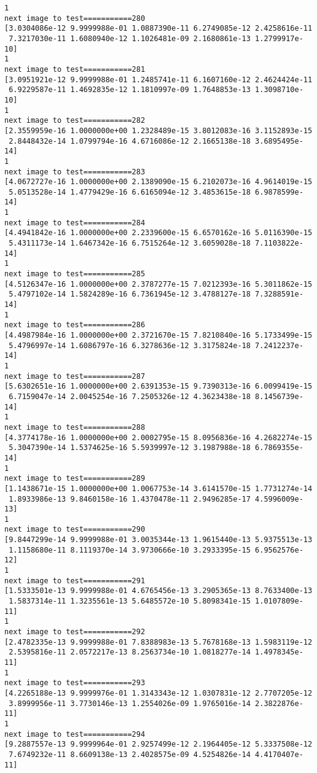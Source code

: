 \documentclass[11pt]{article}
\begin{document}
\begin{Verbatim}[commandchars=\\\{\}]
1
next image to test===========280
[3.0304086e-12 9.9999988e-01 1.0887390e-11 6.2749085e-12 2.4258616e-11
 7.3217030e-11 1.6080940e-12 1.1026481e-09 2.1680861e-13 1.2799917e-10]
1
next image to test===========281
[3.0951921e-12 9.9999988e-01 1.2485741e-11 6.1607160e-12 2.4624424e-11
 6.9229587e-11 1.4692835e-12 1.1810997e-09 1.7648853e-13 1.3098710e-10]
1
next image to test===========282
[2.3559959e-16 1.0000000e+00 1.2328489e-15 3.8012083e-16 3.1152893e-15
 2.8448432e-14 1.0799794e-16 4.6716086e-12 2.1665138e-18 3.6895495e-14]
1
next image to test===========283
[4.0672727e-16 1.0000000e+00 2.1389090e-15 6.2102073e-16 4.9614019e-15
 5.0513528e-14 1.4779429e-16 6.6165094e-12 3.4853615e-18 6.9878599e-14]
1
next image to test===========284
[4.4941842e-16 1.0000000e+00 2.2339600e-15 6.6570162e-16 5.0116390e-15
 5.4311173e-14 1.6467342e-16 6.7515264e-12 3.6059028e-18 7.1103822e-14]
1
next image to test===========285
[4.5126347e-16 1.0000000e+00 2.3787277e-15 7.0212393e-16 5.3011862e-15
 5.4797102e-14 1.5824289e-16 6.7361945e-12 3.4788127e-18 7.3288591e-14]
1
next image to test===========286
[4.4987984e-16 1.0000000e+00 2.3721670e-15 7.8210840e-16 5.1733499e-15
 5.4796997e-14 1.6086797e-16 6.3278636e-12 3.3175824e-18 7.2412237e-14]
1
next image to test===========287
[5.6302651e-16 1.0000000e+00 2.6391353e-15 9.7390313e-16 6.0099419e-15
 6.7159047e-14 2.0045254e-16 7.2505326e-12 4.3623438e-18 8.1456739e-14]
1
next image to test===========288
[4.3774178e-16 1.0000000e+00 2.0002795e-15 8.0956836e-16 4.2682274e-15
 5.3047390e-14 1.5374625e-16 5.5939997e-12 3.1987988e-18 6.7869355e-14]
1
next image to test===========289
[1.1438671e-15 1.0000000e+00 1.0067753e-14 3.6141570e-15 1.7731274e-14
 1.8933986e-13 9.8460158e-16 1.4370478e-11 2.9496285e-17 4.5996009e-13]
1
next image to test===========290
[9.8447299e-14 9.9999988e-01 3.0035344e-13 1.9615440e-13 5.9375513e-13
 1.1158680e-11 8.1119370e-14 3.9730666e-10 3.2933395e-15 6.9562576e-12]
1
next image to test===========291
[1.5333501e-13 9.9999988e-01 4.6765456e-13 3.2905365e-13 8.7633400e-13
 1.5837314e-11 1.3235561e-13 5.6485572e-10 5.8098341e-15 1.0107809e-11]
1
next image to test===========292
[2.4782335e-13 9.9999988e-01 7.8388983e-13 5.7678168e-13 1.5983119e-12
 2.5395816e-11 2.0572217e-13 8.2563734e-10 1.0818277e-14 1.4978345e-11]
1
next image to test===========293
[4.2265188e-13 9.9999976e-01 1.3143343e-12 1.0307831e-12 2.7707205e-12
 3.8999956e-11 3.7730146e-13 1.2554026e-09 1.9765016e-14 2.3822876e-11]
1
next image to test===========294
[9.2887557e-13 9.9999964e-01 2.9257499e-12 2.1964405e-12 5.3337508e-12
 7.6749232e-11 8.6609138e-13 2.4028575e-09 4.5254826e-14 4.4170407e-11]

\end{Verbatim}
\end{document}

